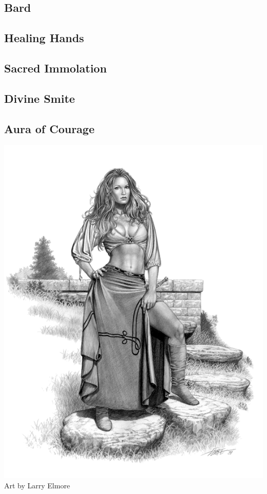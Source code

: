 
\begin{multicols*}{2}

\section{Bard}

\subsection*{Healing Hands}

\subsection*{Sacred Immolation}

\subsection*{Divine Smite}

\subsection*{Aura of Courage}

\begin{Figure}
\centering
\includegraphics[width=\textwidth]{img/bard-2.png}
{\scriptsize Art by Larry Elmore}
\end{Figure}
    
\end{multicols*}

    